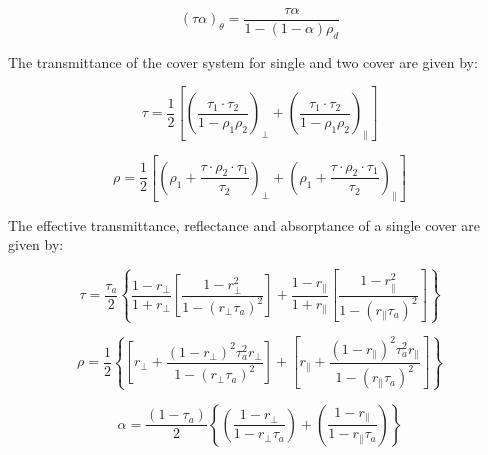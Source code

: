 \begin{equation}
{\left( {\tau \alpha } \right)_\theta } = \frac{{\tau \alpha }}{{1 - \left( {1 - \alpha } \right){\rho_d}}}
\end{equation}

The transmittance of the cover system for single and two cover are given by:

\begin{equation}
\tau  = \frac{1}{2}\left[ {{{\left( {\frac{{{\tau_1} \cdot {\tau_2}}}{{1 - {\rho_1}{\rho_2}}}} \right)}_ \bot } + {{\left( {\frac{{{\tau_1} \cdot {\tau_2}}}{{1 - {\rho_1}{\rho_2}}}} \right)}_\parallel }} \right]
\end{equation}

\begin{equation}
\rho  = \frac{1}{2}\left[ {{{\left( {{\rho_1} + \frac{{\tau  \cdot {\rho_2} \cdot {\tau_1}}}{{{\tau_2}}}} \right)}_ \bot } + {{\left( {{\rho_1} + \frac{{\tau  \cdot {\rho_2} \cdot {\tau_1}}}{{{\tau_2}}}} \right)}_\parallel }} \right]
\end{equation}

The effective transmittance, reflectance and absorptance of a single cover are given by:

\begin{equation}
\tau  = \frac{{{\tau_a}}}{2}\left\{ {\frac{{1 - {r_ \bot }}}{{1 + {r_ \bot }}}\left[ {\frac{{1 - r_ \bot ^2}}{{1 - {{\left( {{r_ \bot }{\tau_a}} \right)}^2}}}} \right] + \frac{{1 - {r_\parallel }}}{{1 + {r_\parallel }}}\left[ {\frac{{1 - r_\parallel ^2}}{{1 - {{\left( {{r_\parallel }{\tau_a}} \right)}^2}}}} \right]} \right\}
\end{equation}

\begin{equation}
\rho  = \frac{1}{2}\left\{ {\left[ {{r_ \bot } + \frac{{{{\left( {1 - {r_ \bot }} \right)}^2}\tau_a^2{r_ \bot }}}{{1 - {{\left( {{r_ \bot }{\tau_a}} \right)}^2}}}} \right] + \left[ {{r_\parallel } + \frac{{{{\left( {1 - {r_\parallel }} \right)}^2}\tau_a^2{r_\parallel }}}{{1 - {{\left( {{r_\parallel }{\tau_a}} \right)}^2}}}} \right]} \right\}
\end{equation}

\begin{equation}
\alpha  = \frac{{\left( {1 - {\tau_a}} \right)}}{2}\left\{ {\left( {\frac{{1 - {r_ \bot }}}{{1 - {r_ \bot }{\tau_a}}}} \right) + \left( {\frac{{1 - {r_\parallel }}}{{1 - {r_\parallel }{\tau_a}}}} \right)} \right\}
\end{equation}

